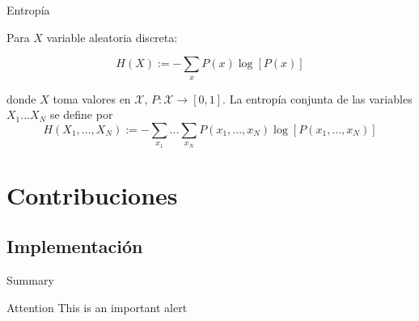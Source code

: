\documentclass{beamer}
\begin{document}

\begin{frame}{Entropía}
	\begin{definition}[Entropía] \label{def:entropy}
        Para $X$ variable aleatoria discreta:  
        
        $$H(X):= - \sum_{x} P(x)\log[P(x)]$$
        
        donde $X$ toma valores en $\mathcal{X}$, $P:\mathcal{X} \rightarrow [0,1]$.
        La entropía conjunta de las variables $X_1...X_N$ se define por 
        $$H(X_1,...,X_N):=-\sum_{x_1}...\sum_{x_N}P(x_1,...,x_N)\log[P(x_1,...,x_N)]$$
    \end{definition}
\end{frame}

\section{Contribuciones}

\subsection{Implementación}

\begin{frame}{Summary}
   	\begin{alertblock}{Attention}
   		\textlatin{This is an important alert}
   	\end{alertblock}
\end{frame}
\end{document}
